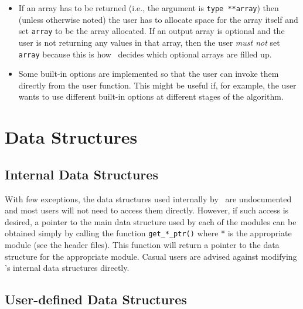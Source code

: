 \begin{description}
\begin{itemize}
\item If an array has to be returned (i.e., the argument is {\tt type
**array}) then (unless otherwise noted) the user has to allocate space for the
array itself and set {\tt *array} to be the array allocated.  If an output
array is optional and the user is not returning any values in that array, then
the user {\em must not} set {\tt *array} because this is how \BB\ decides
which optional arrays are filled up.

\item Some built-in options are implemented so that the user can invoke them
directly from the user function. This might be useful if, for example,
the user wants to use different built-in options at different stages
of the algorithm.
\end{itemize}

\end{description}

\section{Data Structures}

\subsection{Internal Data Structures}

With few exceptions, the data structures used internally by \BB\
are undocumented and most users will not need to access them
directly. However, if such access is desired, a pointer to the main data
structure used by each of the modules can be obtained simply by calling
the function {\tt get\_*\_ptr()} where * is the appropriate module (see the
header files). This function will return a pointer to the data
structure for the appropriate module. Casual users are advised against
modifying \BB's internal data structures directly.

\subsection{User-defined Data Structures}


